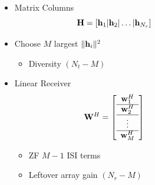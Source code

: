 \documentclass[xcolor=dvipsnames,aspectratio=169]{beamer}
\begin{document}
{\begin{columns}
\begin{column}{6.5cm}
 \end{column}
 \begin{column}{6cm}    
\begin{itemize}
\item Matrix Columns
    $$\mathbf{H}=\left[\mathbf{h}_1|\mathbf{h}_2|\dots|\mathbf{h}_{N_{r}}\right]$$
\item Choose $M$ largest $\|\mathbf{h}_i\|^2$
\begin{itemize}
    \item Diversity $(N_{t}-M)$
\end{itemize}
\item Linear Receiver
    $$\mathbf{W}^H=\left[\begin{array}{c}\mathbf{w}_1^H\\\hline\mathbf{w}_2^H\\\hline\vdots\\\hline \mathbf{w}_{M}^H\end{array}\right]$$
    \vspace{-.1in}
    \begin{itemize}
     \item ZF $M-1$ ISI terms
     \item Leftover array gain $(N_{r}-M)$
    \end{itemize}
\end{itemize}
 \end{column}
\end{columns}
}
\end{document}
